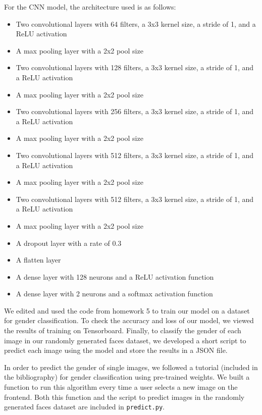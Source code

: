 For the CNN model, the architecture used is as follows:
\begin{itemize}
    \item Two convolutional layers with 64 filters, a 3x3 kernel size, a stride of 1, and a ReLU activation
    \item A max pooling layer with a 2x2 pool size
    \item Two convolutional layers with 128 filters, a 3x3 kernel size, a stride of 1, and a ReLU activation
    \item A max pooling layer with a 2x2 pool size
    \item Two convolutional layers with 256 filters, a 3x3 kernel size, a stride of 1, and a ReLU activation
    \item A max pooling layer with a 2x2 pool size
    \item Two convolutional layers with 512 filters, a 3x3 kernel size, a stride of 1, and a ReLU activation
    \item A max pooling layer with a 2x2 pool size
    \item Two convolutional layers with 512 filters, a 3x3 kernel size, a stride of 1, and a ReLU activation
    \item A max pooling layer with a 2x2 pool size
    \item A dropout layer with a rate of 0.3
    \item A flatten layer
    \item A dense layer with 128 neurons and a ReLU activation function
    \item A dense layer with 2 neurons and a softmax activation function
\end{itemize}

We edited and used the code from homework 5 to train our model on a dataset for gender classification. To check
the accuracy and loss of our model, we viewed the results of training on Tensorboard. Finally, to classify the gender of
each image in our randomly generated faces dataset, we developed a short script to predict each image using the model and
store the results in a JSON file.

In order to predict the gender of single images, we followed a tutorial (included in the bibliography) for gender classification using pre-trained weights.
We built a function to run this algorithm every time a user selects a new image on the frontend. Both this function and the script to predict images in the randomly generated faces dataset are included in \verb|predict.py|.

